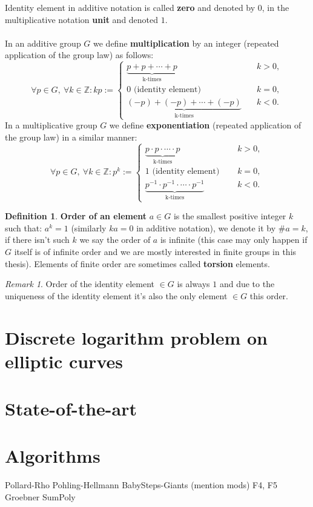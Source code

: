 \documentclass[thesis=M,english]{FITthesis}[2012/10/20]
\theoremstyle{remark}
\newtheorem*{RM}{Remark}
\theoremstyle{definition}
\newtheorem{DF}{Definition}[section]
\begin{document}
\noindent Identity element in additive notation is called \textbf{zero} and denoted by $0$, in the multiplicative notation \textbf{unit} and denoted $1$. \\ \\
In an additive group $G$ we define \textbf{multiplication} by an integer (repeated application of the group law) as follows:
$$
\forall p \in G,\ \forall k \in \mathbb{Z}: kp := \begin{cases} \underbrace{p + p + \cdots + p}_{\text{k-times}} &\quad k > 0, \\
0 \text{ (identity element) } &\quad k = 0, \\
\underbrace{(-p) + (-p) + \cdots + (-p)}_{\text{k-times}} &\quad k < 0.
\end{cases}
$$
In a multiplicative group $G$ we define \textbf{exponentiation} (repeated application of the group law) in a similar manner:
$$
\forall p \in G,\ \forall k \in \mathbb{Z}: p^k := \begin{cases} \underbrace{p \cdot p \cdot \cdots \cdot p}_{\text{k-times}} &\quad k > 0, \\
1 \text{ (identity element) } &\quad k = 0, \\
\underbrace{p^{-1} \cdot p^{-1} \cdot \cdots \cdot p^{-1}}_{\text{k-times}} &\quad k < 0.
\end{cases}
$$
\begin{DF}
\textbf{Order of an element} $a \in G$ is the smallest positive integer $k$ such that: $a^k = 1$ (similarly $ka = 0$ in additive notation), we denote it by $\#a= k$, if there isn't such $k$ we say the order of $a$ is infinite (this case may only happen if $G$ itself is of infinite order and we are mostly interested in finite groups in this thesis). Elements of finite order are sometimes called \textbf{torsion} elements.
\end{DF}
\begin{RM}
Order of the identity element $\in G$ is always $1$ and due to the uniqueness of the identity element it's also the only element $\in G$ this order.
\end{RM}
\chapter{Discrete logarithm problem on elliptic curves}
\chapter{State-of-the-art}

\chapter{Algorithms}
Pollard-Rho
Pohling-Hellmann
BabySteps-Giants (mention mods)
F4, F5 Groebner
SumPoly \cite{iso690}
\end{document}
